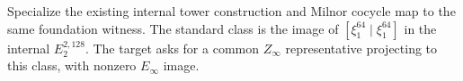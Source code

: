 \begin{definition}
  \label{def:h6-standard-internal-target}
  \notready
  Specialize the existing internal tower construction and Milnor cocycle map
  to the same foundation witness. The standard class is the image of
  $[\xi_1^{64}\mid\xi_1^{64}]$ in the internal $E_2^{2,128}$.
  The target asks for a common $Z_\infty$ representative projecting to this
  class, with nonzero $E_\infty$ image.
\end{definition}
